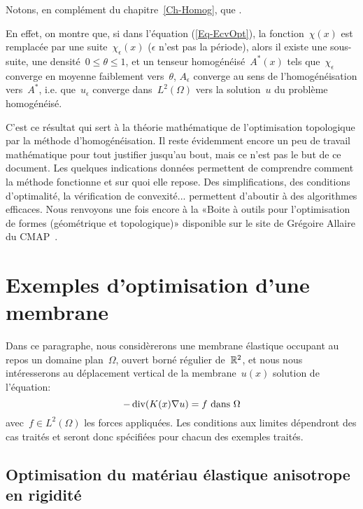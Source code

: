 \medskip
Notons, en complément du chapitre~\ref{Ch-Homog}, que .

En effet, on montre que, si dans l'équation (\ref{Eq-EcvOpt}), la fonction~$\chi(x)$ est remplacée par une suite~$\chi_\epsilon(x)$ ($\epsilon$ n'est pas la période), alors il existe une sous-suite, une densité~$0\le\theta\le1$, et un tenseur homogénéisé~$A^*(x)$ tels que~$\chi_\epsilon$ converge en moyenne faiblement vers~$\theta$, $A_\epsilon$ converge au sens de l'homogénéisation vers~$A^*$, i.e. que~$u_\epsilon$ converge dans~$L^2(\Omega)$ vers la solution~$u$ du problème homogénéisé.

\medskip
C'est ce résultat qui sert à la théorie mathématique de l'optimisation topologique par la méthode d'homogénéisation.
Il reste évidemment encore un peu de travail mathématique pour tout justifier jusqu'au bout, mais ce n'est pas le but de ce document. Les quelques indications données permettent de comprendre comment la méthode fonctionne et sur quoi elle repose.
Des simplifications, des conditions d'optimalité, la vérification de convexité... permettent d'aboutir à des algorithmes efficaces. Nous renvoyons une fois encore à la «Boite à outils \freefem pour l'optimisation de formes (géométrique et topologique)» disponible sur le site de Grégoire Allaire du CMAP~\cite{bib-AllaireOptimFF}.


\medskip
\section{Exemples d'optimisation d'une membrane}

Dans ce paragraphe, nous considèrerons une membrane élastique occupant au repos un domaine plan~$\Omega$, ouvert borné régulier de~$\mathbb R^2$, et nous nous intéresserons au déplacement vertical de la membrane~$u(x)$ solution de l'équation:
\begin{equation}\label{Eq-PbMembrane}
-\operatorname{div}(K(x)\nabla u) = f \text{ dans }\Omega
\end{equation}
avec~$f\in L^2(\Omega)$ les forces appliquées.
Les conditions aux limites dépendront des cas traités et seront donc spécifiées pour chacun des exemples traités.

\medskip
\subsection{Optimisation du matériau élastique anisotrope en rigidité}

